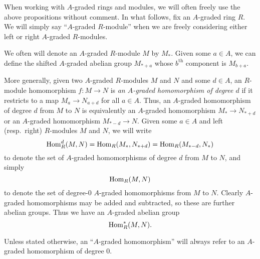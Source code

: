 \documentclass[../main.tex]{subfiles}
\begin{document}
When working with $A$-graded rings and modules, we will often freely use the above propositions without comment. In what follows, fix an $A$-graded ring $R$. We will simply say ``$A$-graded $R$-module'' when we are freely considering either left or right $A$-graded $R$-modules.

\begin{remark}
	We often will denote an $A$-graded $R$-module $M$ by $M_*$. Given some $a\in A$, we can define the shifted $A$-graded abelian group $M_{*+a}$ whose $b^\text{th}$ component is $M_{b+a}$.
\end{remark}

\begin{definition}
    More generally, given two $A$-graded $R$-modules $M$ and $N$ and some $d\in A$, an $R$-module homomorphism $f:M\to N$ is \emph{an $A$-graded homomorphism of degree $d$} if it restricts to a map $M_a\to N_{a+d}$ for all $a\in A$. Thus, an $A$-graded homomorphism of degree $d$ from $M$ to $N$ is equivalently an $A$-graded homomorphism $M_*\to N_{*+d}$ or an $A$-graded homomorphism $M_{*-d}\to N$. Given some $a\in A$ and left (resp.\ right) $R$-modules $M$ and $N$, we will write 
	\[\mathrm{Hom}_R^d(M,N)=\mathrm{Hom}_R(M_*,N_{*+d})=\mathrm{Hom}_R(M_{*-d},N_*)\]
	to denote the set of $A$-graded homomorphisms of degree $d$ from $M$ to $N$, and simply
	\[\mathrm{Hom}_R(M,N)\] 
	to denote the set of degree-$0$ $A$-graded homomorphisms from $M$ to $N$. Clearly $A$-graded homomorphisms may be added and subtracted, so these are further abelian groups. Thus we have an $A$-graded abelian group
	\[\mathrm{Hom}_R^*(M,N).\]
\end{definition}

Unless stated otherwise, an ``$A$-graded homomorphism'' will always refer to an $A$-graded homomorphism of degree $0$. 
\end{document}
